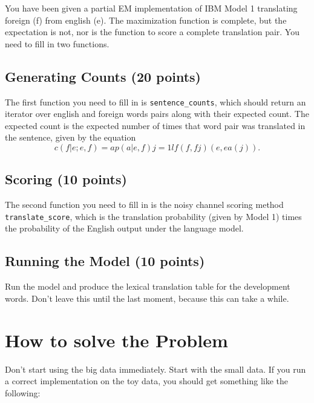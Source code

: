 \documentclass[11pt]{article}
\begin{document}
You have been given a partial EM implementation of IBM Model 1 translating foreign (f) from english (e).  The maximization function is complete, but the expectation is not, nor is the function to score a complete translation pair.  You need to fill in two functions.

\subsection*{Generating Counts (20 points)}

The first function you need to fill in is \texttt{sentence\_counts}, which should return an iterator over english and foreign words pairs along with their expected count.  The expected count is the expected number of times that word pair was translated in the sentence, given by the equation
\begin{equation}
c(f|e;e, f) = ap(a|e, f) j=1lf(f, fj)(e, ea(j)).
\end{equation}

\subsection*{Scoring (10 points)}

The second function you need to fill in is the noisy channel scoring method \texttt{translate\_score}, which is the translation probability (given by Model 1) times the probability of the English output under the language model.

\subsection*{Running the Model (10 points)}

Run the model and produce the lexical translation table for the development words.  Don't leave this until the last moment, because this can take a while.

\section*{How to solve the Problem}

Don't start using the big data immediately.  Start with the small data.  If you run a correct implementation on the toy data, you should get something like the following:
\end{document}
